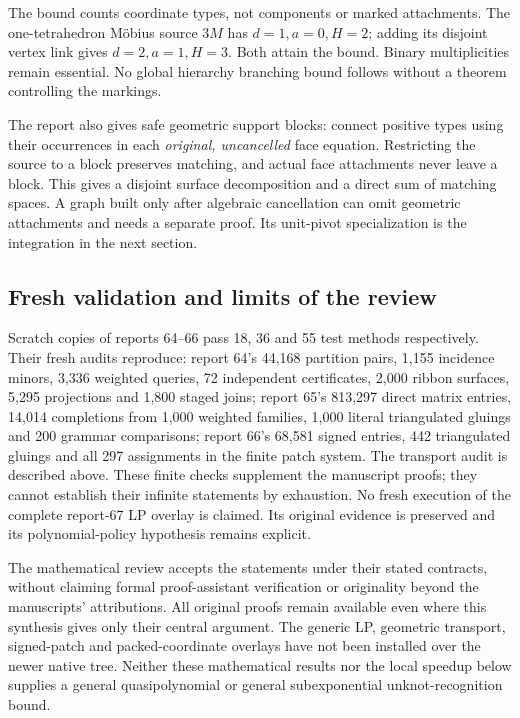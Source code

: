 The bound counts coordinate types, not components or marked attachments.
The one-tetrahedron M\"obius source $3M$ has $d=1,a=0,H=2$; adding its
disjoint vertex link gives $d=2,a=1,H=3$. Both attain the bound. Binary
multiplicities remain essential. No global hierarchy branching bound follows
without a theorem controlling the markings.

The report also gives safe geometric support blocks: connect positive types
using their occurrences in each \emph{original, uncancelled} face equation.
Restricting the source to a block preserves matching, and actual face
attachments never leave a block. This gives a disjoint surface decomposition
and a direct sum of matching spaces. A graph built only after algebraic
cancellation can omit geometric attachments and needs a separate proof.
Its unit-pivot specialization is the integration in the next section.

\subsection{Fresh validation and limits of the review}

Scratch copies of reports 64--66 pass 18, 36 and 55 test methods respectively.
Their fresh audits reproduce: report 64's 44,168 partition pairs, 1,155
incidence minors, 3,336 weighted queries, 72 independent certificates,
2,000 ribbon surfaces, 5,295 projections and 1,800 staged joins; report
65's 813,297 direct matrix entries, 14,014 completions from 1,000 weighted
families, 1,000 literal triangulated gluings and 200 grammar comparisons;
report 66's 68,581 signed entries, 442 triangulated gluings and all 297
assignments in the finite patch system. The transport audit is described
above. These finite checks supplement the manuscript proofs; they cannot
establish their infinite statements by exhaustion. No fresh execution of
the complete report-67 LP overlay is claimed. Its original evidence is
preserved and its polynomial-policy hypothesis remains explicit.

The mathematical review accepts the statements under their stated contracts,
without claiming formal proof-assistant verification or originality beyond
the manuscripts' attributions. All original proofs remain available even
where this synthesis gives only their central argument. The generic LP,
geometric transport, signed-patch and packed-coordinate overlays have not
been installed over the newer native tree. Neither these mathematical
results nor the local speedup below supplies a general quasipolynomial or
general subexponential unknot-recognition bound.
